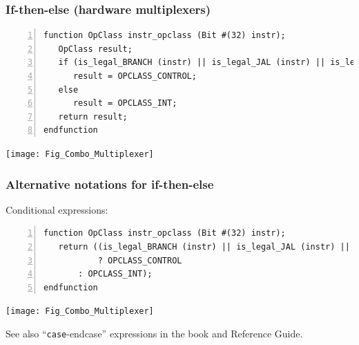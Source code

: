 \begin{frame}[fragile]
\frametitle{If-then-else (hardware multiplexers)}

\footnotesize

\begin{Verbatim}[frame=single, numbers=left]
function OpClass instr_opclass (Bit #(32) instr);
   OpClass result;
   if (is_legal_BRANCH (instr) || is_legal_JAL (instr) || is_legal_JALR (instr))
      result = OPCLASS_CONTROL;
   else
      result = OPCLASS_INT;
   return result;
endfunction
\end{Verbatim}

\vspace{2ex}

\begin{center}
 \texttt{[image: Fig\_Combo\_Multiplexer]}
\end{center}

\end{frame}


\begin{frame}[fragile]
\frametitle{Alternative notations for if-then-else}

\footnotesize

Conditional expressions:

\begin{Verbatim}[frame=single, numbers=left]
function OpClass instr_opclass (Bit #(32) instr);
   return ((is_legal_BRANCH (instr) || is_legal_JAL (instr) || is_legal_JALR (instr))
           ? OPCLASS_CONTROL
	   : OPCLASS_INT);
endfunction
\end{Verbatim}

\vspace{1ex}

\begin{center}
 \texttt{[image: Fig\_Combo\_Multiplexer]}
\end{center}

\vspace{3ex}

See also ``{\tt case}-{endcase}'' expressions in the book and {\BSV} Reference Guide.

\end{frame}


